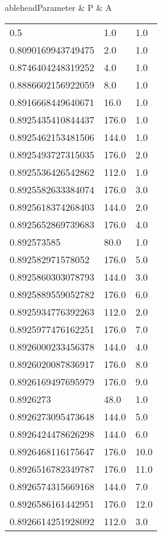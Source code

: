 \begin{center}
\twocolumn
{}
	ablehead{Parameter & P & A \\}
\tabletail{%
}
\tablelasttail{\hline}
\begin{supertabular}[H]{p{0.30\textwidth}p{0.05\textwidth}p{0.05\textwidth}}
0.5 & 1.0 & 1.0 \\ 
0.8090169943749475 & 2.0 & 1.0 \\ 
0.8746404248319252 & 4.0 & 1.0 \\ 
0.8886602156922059 & 8.0 & 1.0 \\ 
0.8916668449640671 & 16.0 & 1.0 \\ 
0.8925435410844437 & 176.0 & 1.0 \\ 
0.8925462153481506 & 144.0 & 1.0 \\ 
0.8925493727315035 & 176.0 & 2.0 \\ 
0.8925536426542862 & 112.0 & 1.0 \\ 
0.8925582633384074 & 176.0 & 3.0 \\ 
0.8925618374268403 & 144.0 & 2.0 \\ 
0.8925652869739683 & 176.0 & 4.0 \\ 
0.892573585 & 80.0 & 1.0 \\ 
0.892582971578052 & 176.0 & 5.0 \\ 
0.8925860303078793 & 144.0 & 3.0 \\ 
0.8925889559052782 & 176.0 & 6.0 \\ 
0.8925934776392263 & 112.0 & 2.0 \\ 
0.8925977476162251 & 176.0 & 7.0 \\ 
0.8926000233456378 & 144.0 & 4.0 \\ 
0.8926020087836917 & 176.0 & 8.0 \\ 
0.8926169497695979 & 176.0 & 9.0 \\ 
0.8926273 & 48.0 & 1.0 \\ 
0.8926273095473648 & 144.0 & 5.0 \\ 
0.8926424478626298 & 144.0 & 6.0 \\ 
0.8926468116175647 & 176.0 & 10.0 \\ 
0.8926516782349787 & 176.0 & 11.0 \\ 
0.8926574315669168 & 144.0 & 7.0 \\ 
0.8926586161442951 & 176.0 & 12.0 \\ 
0.8926614251928092 & 112.0 & 3.0 \\ 

\end{supertabular}
\end{center}
